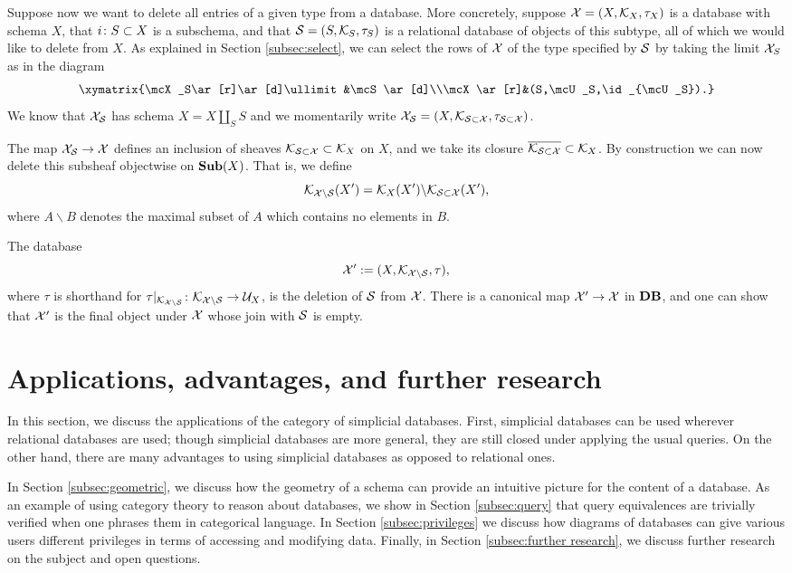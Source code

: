 \documentclass{amsart}
\begin{document}
Suppose now we want to delete all entries of a given type from a database.  More concretely, suppose $\mathcal{X}=(X,\mathcal{K}_X,\tau_X)$ is a database with schema $X$, that $i\colon S\subset X$ is a subschema, and that $\mathcal{S}=(S,\mathcal{K}_S,\tau_S)$ is a relational database of objects of this subtype, all of which we would like to delete from $X$.  As explained in Section \ref{subsec:select}, we can select the rows of $\mathcal{X}$ of the type specified by $\mathcal{S}$ by taking the limit $\mathcal{X}_S$ as in the diagram $$\xymatrix{\mcX_S\ar[r]\ar[d]\ullimit&\mcS\ar[d]\\\mcX\ar[r]&(S,\mcU_S,\id_{\mcU_S}).}$$  We know that $\mathcal{X}_\mathcal{S}$ has schema $X=X\amalg_SS$ and we momentarily write $\mathcal{X}_\mathcal{S}=(X,\mathcal{K}_{\mathcal{S}\subset\mathcal{X}},\tau_{\mathcal{S}\subset\mathcal{X}})$.  

The map $\mathcal{X}_\mathcal{S}\rightarrow\mathcal{X}$ defines an inclusion of sheaves $\mathcal{K}_{\mathcal{S}\subset\mathcal{X}}\subset\mathcal{K}_X$ on $X$, and we take its closure $\overline{\mathcal{K}_{\mathcal{S}\subset\mathcal{X}}}\subset\mathcal{K}_X$.  By construction we can now delete this subsheaf objectwise on ${\bf Sub}(X)$.  That is, we define $$\mathcal{K}_{\mathcal{X}\backslash\mathcal{S}}(X')=\mathcal{K}_X(X')\backslash\mathcal{K}_{\mathcal{S}\subset\mathcal{X}}(X'),$$ where $A\backslash B$ denotes the maximal subset of $A$ which contains no elements in $B$.

The database $$\mathcal{X}':=(X,\mathcal{K}_{\mathcal{X}\backslash\mathcal{S}},\tau),$$ where $\tau$ is shorthand for $\tau|_{\mathcal{K}_{\mathcal{X}\backslash\mathcal{S}}}\colon\mathcal{K}_{\mathcal{X}\backslash\mathcal{S}}\rightarrow\mathcal{U}_X$, is the deletion of $\mathcal{S}$ from $\mathcal{X}$.  There is a canonical map $\mathcal{X}'\rightarrow\mathcal{X}$ in ${\bf DB}$, and one can show that $\mathcal{X}'$ is the final object under $\mathcal{X}$ whose join with $\mathcal{S}$ is empty.

\section{Applications, advantages, and further research}\label{sec:applications}

In this section, we discuss the applications of the category of simplicial databases.  First, simplicial databases can be used wherever relational databases are used; though simplicial databases are more general, they are still closed under applying the usual queries.  On the other hand, there are many advantages to using simplicial databases as opposed to relational ones.  

In Section \ref{subsec:geometric}, we discuss how the geometry of a schema can provide an intuitive picture for the content of a database.  As an example of using category theory to reason about databases, we show in Section \ref{subsec:query} that query equivalences are trivially verified when one phrases them in categorical language.  In Section \ref{subsec:privileges} we discuss how diagrams of databases can give various users different privileges in terms of accessing and modifying data.  Finally, in Section \ref{subsec:further research}, we discuss further research on the subject and open questions.
\end{document}
